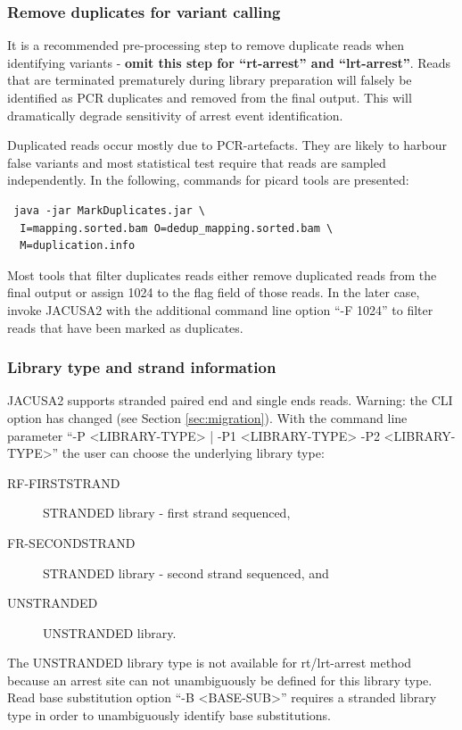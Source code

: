 \documentclass[10pt,a4paper]{article}
\begin{document}
\subsubsection{Remove duplicates for variant calling}
It is a recommended pre-processing step to remove duplicate reads when identifying variants - \textbf{omit 
this step for ``rt-arrest'' and ``lrt-arrest''}. Reads that are terminated prematurely during 
library preparation will falsely be identified as PCR duplicates and removed from the final output. 
This will dramatically degrade sensitivity of arrest event identification.

Duplicated reads occur mostly due to PCR-artefacts. They are likely to harbour false variants and 
most statistical test require that reads are sampled independently.
In the following, commands for picard tools are presented:
\begin{verbatim} java -jar MarkDuplicates.jar \ 
  I=mapping.sorted.bam O=dedup_mapping.sorted.bam \ 
  M=duplication.info
\end{verbatim}
Most tools that filter duplicates reads either remove duplicated reads from the final output or assign 1024 
to the flag field of those reads. In the later case, invoke JACUSA2 with the additional command line 
option ``-F 1024'' to filter reads that have been marked as duplicates.
\subsubsection{Library type and strand information}
JACUSA2 supports stranded paired end and single ends reads. Warning: the CLI option has changed 
(see Section \ref{sec:migration}).
With the command line parameter ``-P <LIBRARY-TYPE> | -P1 <LIBRARY-TYPE> -P2 <LIBRARY-TYPE>'' the 
user can choose the underlying library type:
\begin{description} 
\item[RF-FIRSTSTRAND] STRANDED library - first strand sequenced,
\item[FR-SECONDSTRAND] STRANDED library - second strand sequenced, and
\item[UNSTRANDED] UNSTRANDED library.
\end{description}
The UNSTRANDED library type is not available for rt/lrt-arrest method because an arrest site can not 
unambiguously be defined for this library type. Read base substitution option ``-B <BASE-SUB>'' 
requires a stranded library type in order to unambiguously identify base substitutions.
\end{document}
